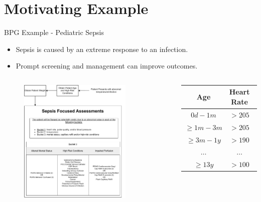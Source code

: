 \documentclass{beamer}
\begin{document}
\section{Motivating Example}
\begin{frame}{BPG Example - Pediatric Sepsis}
  \begin{itemize}
    \item Sepsis is caused by an extreme response to an infection.
    \item Prompt screening and management can improve outcomes.
  \end{itemize}
  \pause
  \begin{columns}
    \begin{figure}
      \includegraphics[width=0.8\textwidth]{sepsis-screening-osf}
    \end{figure}
    \tiny
    \begin{tabular}{ | c || c | c | }
      \hline
      \textbf{Age}            & \textbf{Heart Rate}    & \textbf{Temp}  \\
      \hline
      $0d - 1m$               & $>205$                 & $<36 \text{ or } >38$ \\
      \hline
      $\geq 1m - 3m$          & $>205$                 & $<36 \text{ or } >38$ \\
      \hline
      $\geq 3m - 1y$          & $>190$                 & $<36 \text{ or } >38.5$ \\
      \hline
      $\dots$                 & $\dots$                & $\dots$ \\
      \hline
      $\geq 13y$              & $>100$                 & $<36 \text{ or } >38.5$ \\
      \hline
    \end{tabular}
  \end{columns}
\end{frame}
\end{document}
